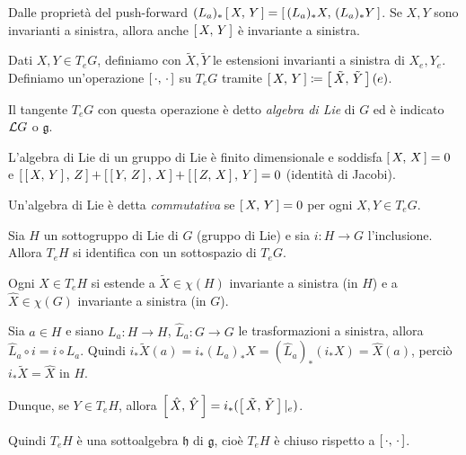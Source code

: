 Dalle proprietà del push-forward $(L_a)_* \left[\,X,\,Y\,\right] = \left[\,(L_a)_*X,\,(L_a)_*Y\,\right]$. Se $X,Y$ sono invarianti a sinistra, allora anche $\left[\,X,\,Y\,\right]$ è invariante a sinistra.

Dati $X,Y \in T_eG$, definiamo con $\tilde X,\tilde Y$ le estensioni invarianti a sinistra di $X_e,Y_e$.
Definiamo un'operazione $\left[\,\cdot,\,\cdot\,\right]$ su $T_eG$ tramite $\left[\,X,\,Y\,\right] \coloneqq \left[\,\tilde X,\,\tilde Y\,\right](e)$.


\begin{definition} 
	Il tangente $T_eG$ con questa operazione è detto \emph{algebra di Lie} di $G$ ed è indicato $\mathcal L G$ o $\mathfrak g$.
\end{definition}

L'algebra di Lie di un gruppo di Lie è finito dimensionale e soddisfa $\left[\,X,\,X\,\right] = 0$ e $\left[\,\left[\,X,\,Y\,\right],\,Z\,\right] + \left[\,\left[\,Y,\,Z\,\right],\,X\,\right] + \left[\,\left[\,Z,\,X\,\right],\,Y\,\right] = 0$ (identità di Jacobi).


\begin{definition} 
	Un'algebra di Lie è detta \emph{commutativa} se $\left[\,X,\,Y\,\right] = 0$ per ogni $X,Y \in T_eG$.
\end{definition}


Sia $H$ un sottogruppo di Lie di $G$ (gruppo di Lie) e sia $i: H \to G$ l'inclusione. Allora $T_eH$ si identifica con un sottospazio di $T_eG$.


Ogni $X \in T_eH$ si estende a $\tilde X \in \chi(H)$ invariante a sinistra (in $H$) e a $\hat X \in \chi(G)$ invariante a sinistra (in $G$).

Sia $a\in H$ e siano $L_a:H\to H$, $\hat L_a:G \to G$ le trasformazioni a sinistra, allora $\hat L_a \circ i = i \circ L_a$. Quindi $i_* \tilde X(a) = i_* (L_a)_* X = (\hat L_a)_* (i_* X) = \hat X(a)$, perciò $i_* \tilde X = \hat X$ in $H$.

Dunque, se $Y \in T_eH$, allora $\left[\,\hat X,\,\hat Y\,\right] = i_*( \left[\,\tilde X,\,\tilde Y\,\right] |_ e )$.

Quindi $T_eH$ è una sottoalgebra $\mathfrak h$ di $\mathfrak g$, cioè $T_eH$ è chiuso rispetto a $\left[\,\cdot,\,\cdot\,\right]$.

